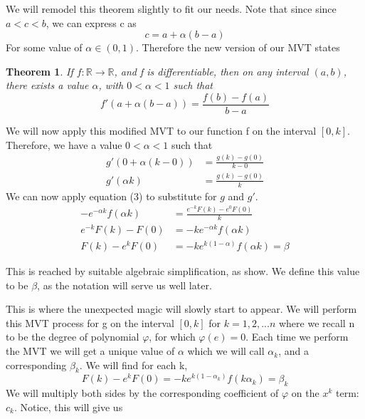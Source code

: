 \documentclass{article}
\newtheorem{theorem}{Theorem}
\begin{document}
We will remodel this theorem slightly to fit our needs. Note that since since $a<c<b$, we can express c as
\begin{equation*}
    c=a+\alpha(b-a)
\end{equation*}
For some value of $\alpha \in (0,1)$. Therefore the new version of our MVT states
\begin{theorem}
If $f:\mathbb{R}\rightarrow \mathbb{R}$, and f is differentiable, then on any interval $(a,b)$, there exists a value $\alpha$, with $0<\alpha<1$ such that
\[ f'(a+\alpha(b-a))=\frac{f(b)-f(a)}{b-a}\]
\end{theorem}  
We will now apply this modified MVT to our function f on the interval $[0,k]$. Therefore, we have a value $0<\alpha<1$ such that 
\begin{equation*}
    \begin{split}
        g'(0+\alpha(k-0))&=\frac{g(k)-g(0)}{k-0} \\
        g'(\alpha k)&=\frac{g(k)-g(0)}{k}
    \end{split}
\end{equation*}
We can now apply equation (3) to  substitute for $g$ and $g'$.
\begin{equation*}
    \begin{split}
        -e^{-\alpha k}f(\alpha k)&=\frac{e^{-k}F(k)-e^{0}F(0)}{k} \\
       e^{-k}F(k)-F(0)&= -ke^{-\alpha k}f(\alpha k) \\
        F(k)-e^kF(0)&= -ke^{k(1-\alpha) }f(\alpha k) =\beta
    \end{split}
\end{equation*}
\par
This is reached by suitable algebraic simplification, as show. We define this value to be $\beta$, as the notation will serve us well later. 
\par
This is where the unexpected magic will slowly start to appear. We will perform this MVT process for g on the interval $[0,k]$ for $k=1,2,...n$ where we recall n to be the degree of polynomial $\varphi$, for which $\varphi(e)=0$. Each time we perform the MVT we will get a unique value of $\alpha$ which we will call $\alpha_k$, and a corresponding $\beta_k$. We will find for each k,
\begin{equation*}
    F(k)-e^{k}F(0)=-ke^{k(1-\alpha_{k})}f(k \alpha_k)=\beta_k
\end{equation*}  
We will multiply both sides by the corresponding coefficient of $\varphi$ on the $x^k$ term:$c_k$. Notice, this will give us
\end{document}
